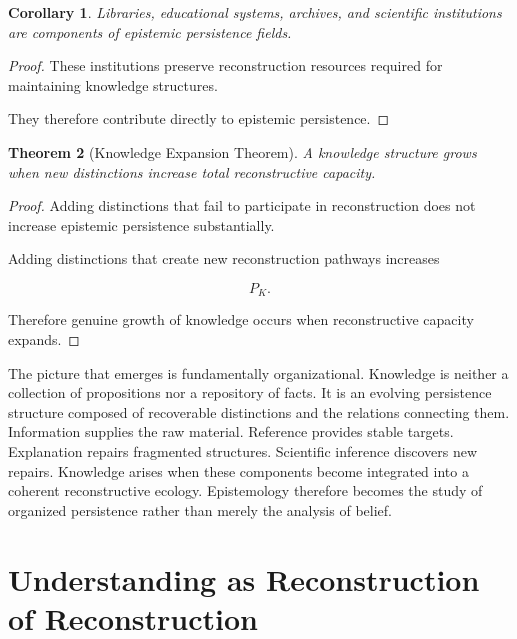 \documentclass[12pt,oneside]{article}
\newtheorem{theorem}{Theorem}[section] \newtheorem{lemma}[theorem]{Lemma} \newtheorem{proposition}[theorem]{Proposition} \newtheorem{corollary}[theorem]{Corollary}
\theoremstyle{definition}
\begin{document}
\begin{corollary}

Libraries, educational systems, archives, and scientific institutions are components of epistemic persistence fields.

\end{corollary}

\begin{proof}

These institutions preserve reconstruction resources required for maintaining knowledge structures.

They therefore contribute directly to epistemic persistence.

\end{proof}

\begin{theorem}[Knowledge Expansion Theorem]

A knowledge structure grows when new distinctions increase total reconstructive capacity.

\end{theorem}

\begin{proof}

Adding distinctions that fail to participate in reconstruction does not increase epistemic persistence substantially.

Adding distinctions that create new reconstruction pathways increases

\[
P_K.
\]

Therefore genuine growth of knowledge occurs when reconstructive capacity expands.

\end{proof}

The picture that emerges is fundamentally organizational. Knowledge is neither a collection of propositions nor a repository of facts. It is an evolving persistence structure composed of recoverable distinctions and the relations connecting them. Information supplies the raw material. Reference provides stable targets. Explanation repairs fragmented structures. Scientific inference discovers new repairs. Knowledge arises when these components become integrated into a coherent reconstructive ecology. Epistemology therefore becomes the study of organized persistence rather than merely the analysis of belief.

\section{Understanding as Reconstruction of Reconstruction}
\end{document}
